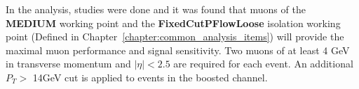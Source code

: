 %
%

In the analysis, studies were done and it was found that muons of the \textbf{MEDIUM} working point and the \textbf{FixedCutPFlowLoose} isolation working point (Defined in Chapter~\ref{chapter:common_analysis_items}) will provide the maximal muon performance and signal sensitivity. Two muons of at least 4 GeV in transverse momentum and $|\eta|<2.5$ are required for each event. An additional $P_{T}>$ 14GeV cut is applied to events in the boosted channel.

